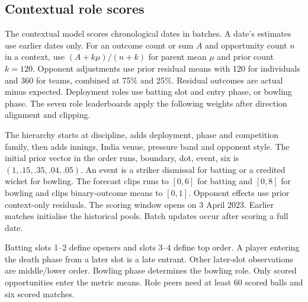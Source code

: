\documentclass[12pt,a4paper]{article}
\begin{document}
\subsection{Contextual role scores}
The contextual model scores chronological dates in batches. A date's estimates use earlier dates only. For an outcome count or sum $A$ and opportunity count $n$ in a context, use $(A+k\mu)/(n+k)$ for parent mean $\mu$ and prior count $k=120$. Opponent adjustments use prior residual means with 120 for individuals and 360 for teams, combined at 75\% and 25\%. Residual outcomes are actual minus expected. Deployment roles use batting slot and entry phase, or bowling phase. The seven role leaderboards apply the following weights after direction alignment and clipping.

The hierarchy starts at discipline, adds deployment, phase and competition family, then adds innings, India venue, pressure band and opponent style. The initial prior vector in the order runs, boundary, dot, event, six is $(1,.15,.35,.04,.05)$. An event is a striker dismissal for batting or a credited wicket for bowling. The forecast clips runs to $[0,6]$ for batting and $[0,8]$ for bowling and clips binary-outcome means to $[0,1]$. Opponent effects use prior context-only residuals. The scoring window opens on 3 April 2023. Earlier matches initialise the historical pools. Batch updates occur after scoring a full date.

Batting slots 1--2 define openers and slots 3--4 define top order. A player entering the death phase from a later slot is a late entrant. Other later-slot observations are middle/lower order. Bowling phase determines the bowling role. Only scored opportunities enter the metric means. Role peers need at least 60 scored balls and six scored matches.
\end{document}
